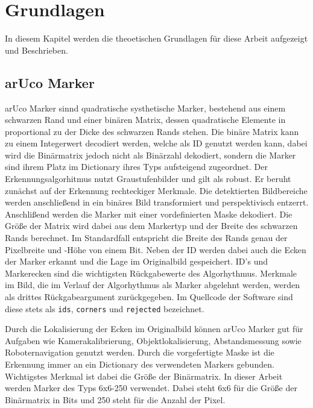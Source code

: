 \chapter{Grundlagen}

In diesem Kapitel werden die theoetischen Grundlagen für diese Arbeit aufgezeigt und Beschrieben. 

\section{arUco Marker}\label{arucoMarker}

arUco Marker sinnd quadratische systhetische Marker, bestehend aus einem schwarzen Rand und einer binären Matrix, dessen quadratische 
Elemente in proportional zu der Dicke des schwarzen Rands stehen. Die binäre Matrix kann zu einem Integerwert decodiert werden, welche
als ID genutzt werden kann, dabei wird die Binärmatrix jedoch nicht als Binärzahl dekodiert, sondern die Marker sind ihrem Platz im Dictionary ihres Typs aufsteigend zugeordnet.
Der Erkennungsalgorhitmus nutzt Graustufenbilder und gilt als robust. 
Er beruht zunächst auf der Erkennung rechteckiger Merkmale. 
Die detektierten Bildbereiche werden anschließend in ein binäres Bild transformiert und perspektivisch entzerrt. 
Anschlißend werden die Marker mit einer vordefinierten Maske dekodiert.
Die Größe der Matrix wird dabei aus dem Markertyp und der Breite des schwarzen Rands berechnet.
Im Standardfall entspricht die Breite des Rands genau der Pixelbreite und -Höhe von einem Bit. 
Neben der ID werden dabei auch die Ecken der Marker erkannt und die Lage im Originalbild gespeichert. 
ID's und Markerecken sind die wichtigsten Rückgabewerte des Algorhythmus.
Merkmale im Bild, die im Verlauf der Algorhythmus als Marker abgelehnt werden, werden als drittes Rückgabeargument zurückgegeben.
Im Quellcode der Software sind diese stets als \verb|ids|, \verb|corners| und \verb|rejected| bezeichnet.

Durch die Lokalisierung der Ecken im Originalbild können arUco Marker gut für Aufgaben wie Kamerakalibrierung, Objektlokalisierung, Abstandsmessung sowie Roboternavigation genutzt werden.
\cite[OpenCV arUco]{OpenCVaruco}
Durch die vorgefertigte Maske ist die Erkennung immer an ein Dictionary des verwendeten Markers gebunden. 
Wichtigstes Merkmal ist dabei die Größe der Binärmatrix. In dieser Arbeit werden Marker des Typs 6x6-250 verwendet.
Dabei steht 6x6 für die Größe der Binärmatrix in Bits und 250 steht für die Anzahl der Pixel.

